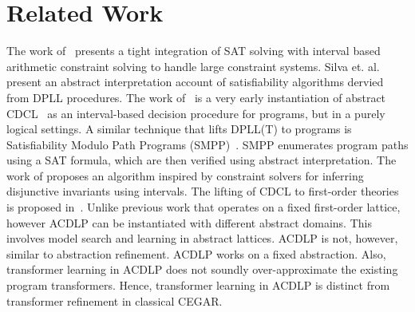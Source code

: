 \section{Related Work}
%
The work of~\cite{franzle} presents a tight integration of SAT solving
with interval based arithmetic constraint solving to handle large constraint
systems. 
%
Silva et. al.~\cite{sas12} present an abstract interpretation account of 
satisfiability algorithms dervied from DPLL procedures.  
%
The work of~\cite{tacas12} is a very early instantiation of abstract 
CDCL~\cite{sas12} as an interval-based decision procedure for programs, 
but in a purely logical settings.  
%
A similar technique that lifts DPLL(T) to programs is Satisfiability Modulo 
Path Programs (SMPP)~\cite{SMPP}. SMPP enumerates program paths using a SAT 
formula, which are then verified using abstract interpretation.  
%
The work of \cite{DBLP:conf/esop/MineBR16} proposes an algorithm inspired by 
constraint solvers for inferring disjunctive invariants using intervals.
%
The lifting of CDCL to first-order theories is proposed in~\cite{dpll,ndsmt}.
%
  Unlike previous work that operates on a fixed first-order lattice, however 
  ACDLP can be instantiated with different abstract domains.  This
  involves model search and learning in abstract lattices. ACDLP is not, however,
  similar to abstraction refinement. ACDLP works on a fixed
  abstraction. Also, transformer learning in ACDLP does not soundly over-approximate
  the existing program transformers. Hence, transformer learning in ACDLP is
  distinct from transformer refinement in classical CEGAR. 

%
%
%
%

